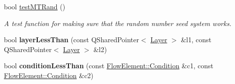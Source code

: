 \begin{DoxyCompactItemize}
\item 
bool \hyperlink{namespace_picto_a52c3955e0ca031d33c1218268c57930a}{test\-M\-T\-Rand} ()
\begin{DoxyCompactList}\small\item\em A test function for making sure that the random number seed system works. \end{DoxyCompactList}\item 
\hypertarget{namespace_picto_aee976c179c6df78a8f4ed26f49da2303}{bool {\bfseries layer\-Less\-Than} (const Q\-Shared\-Pointer$<$ \hyperlink{class_picto_1_1_layer}{Layer} $>$ \&l1, const Q\-Shared\-Pointer$<$ \hyperlink{class_picto_1_1_layer}{Layer} $>$ \&l2)}\label{namespace_picto_aee976c179c6df78a8f4ed26f49da2303}

\item 
\hypertarget{namespace_picto_a8d7f20e296d3076848ead90c81635b81}{bool {\bfseries condition\-Less\-Than} (const \hyperlink{struct_picto_1_1_flow_element_1_1_condition}{Flow\-Element\-::\-Condition} \&c1, const \hyperlink{struct_picto_1_1_flow_element_1_1_condition}{Flow\-Element\-::\-Condition} \&c2)}\label{namespace_picto_a8d7f20e296d3076848ead90c81635b81}

\end{DoxyCompactItemize}

